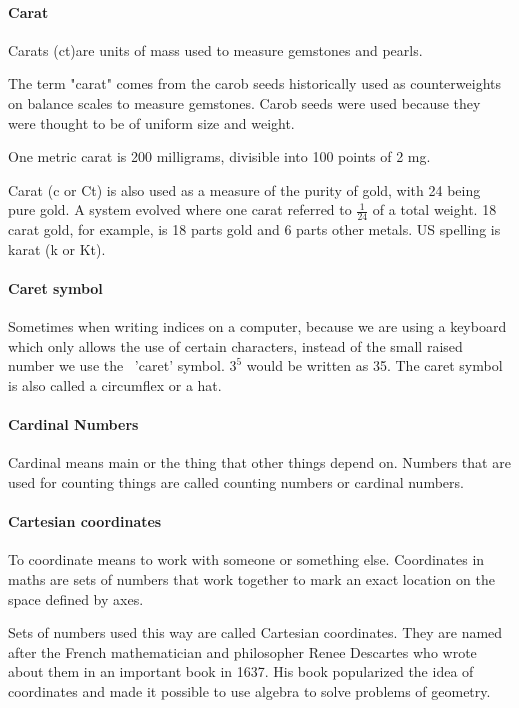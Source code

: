 \documentclass[12pt]{article}
\begin{document}
\paragraph{Carat}
Carats (ct)are units of mass used to measure gemstones and pearls.

The term "carat" comes from the carob seeds historically used as counterweights on balance scales to measure gemstones. Carob seeds were used because they were thought to be of uniform size and weight.

One metric carat is 200 milligrams, divisible into 100 points of 2 mg.

Carat (c or Ct) is also used as a measure of the purity of gold, with 24 being pure gold. A system evolved where one carat referred to $\frac{1}{24}$ of a total weight. 18 carat gold, for example, is 18 parts gold and 6 parts other metals. US spelling is karat (k or Kt).

\paragraph{Caret symbol{\fontsize{30}{34}\selectfont {\raisebox{-.8ex}{\textasciicircum}}}}
Sometimes when writing indices on a computer, because we are using a keyboard which only allows the use of certain characters, instead of the small raised number we use the {\fontsize{30}{34}\selectfont {\raisebox{-.8ex}{\textasciicircum}}} \ 'caret' symbol. $3^5$ would be written as 3{\fontsize{30}{34}\selectfont {\raisebox{-.8ex}{\textasciicircum}}}5. The caret symbol is also called a circumflex or a hat.\\

\paragraph{Cardinal Numbers}
Cardinal means main or the thing that other things depend on. Numbers that are used for counting things are called counting numbers or cardinal numbers.

\paragraph{Cartesian coordinates}
To coordinate means to work with someone or something else. Coordinates in maths are sets of numbers that work together to mark an exact location on the space defined by axes.

Sets of numbers used this way are called Cartesian coordinates. They are named after the French mathematician and philosopher Renee Descartes who wrote about them in an important book in 1637. His book popularized the idea of coordinates and made it possible to use algebra to solve problems of geometry.
\end{document}
